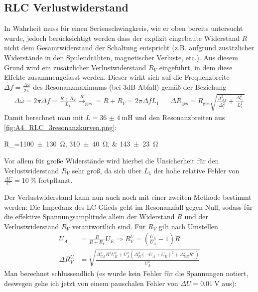 \subsection{RLC Verlustwiderstand}
\label{sec:RLC_Verlustwiderstand}
In Wahrheit muss für einen Serienschwingkreis, wie er oben bereits untersucht wurde, jedoch berücksichtigt werden dass der explizit eingebaute Widerstand \(R\) nicht dem Gesamtwiderstand der Schaltung entspricht (z.B. aufgrund zusätzlicher Widerstände in den Spulendrähten, magnetischer Verluste, etc.). Aus diesem Grund wird ein zusätzlicher Verlustwiderstand \(R_V\) eingeführt, in dem diese Effekte zusammengefasst werden. Dieser wirkt sich auf die Frequenzbreite \(\Delta f = \frac{\Delta\omega}{2\pi}\) des Resonanzmaximums (bei 3dB Abfall) gemäß der Beziehung
\begin{align}
    \Delta\omega=2\pi\Delta f=\frac{R+R_V}{L_1}\xrightarrow R_\text{ges}=R+R_V=2\pi\Delta f L_1&&\Delta R_\text{ges}=R_\text{ges}\sqrt{\frac{\Delta_{\Delta f}^{2}}{\Delta_{f}^{2}} + \frac{\Delta_{L_1}^{2}}{L_1^{2}}}
\end{align} 
Damit berechnet man mit \(L=\qty{36(4)}{\milli\henry}\) und den Resonanzbreiten aus \cref{fig:A4_RLC_3resonanzkurven.png}:
\begin{rbl}
    R_=\qtylist{1100(130);310(40);143(23)}{\ohm}
\end{rbl}
Vor allem für große Widerstände wird hierbei die Unsicherheit für den Verlustwiderstand \(R_V\) sehr groß, da sich über \(L_1\) der hohe relative Fehler von \(\frac{\Delta C}{C}=\qty{10}{\percent}\) fortpflanzt.

Der Verlustwiderstand kann nun auch noch mit einer zweiten Methode bestimmt werden: Die Impedanz des LC-Glieds geht im Resonanzfall gegen Null, sodass für die effektive Spannungsamplitude allein der Widerstand \(R\) und der Verlustwiderstand \(R_V\) verantwortlich sind. Für \(R_V\) gilt nach Umstellen 
\begin{align}
    U_A&=\frac{R}{R+R_V}U_E \Rightarrow  R_V^U=\left(\frac{U_E}{U_A}-1\right)R\\
    \Delta R_V^U&=\sqrt{\frac{\Delta_{U A}^{2} R^{2} U_{E}^{2} + U_{A}^{2} \left(\Delta_{R}^{2} \left(- U_{A} + U_{E}\right)^{2} + \Delta_{U E}^{2} R^{2}\right)}{U_{A}^{4}}}
\end{align}
Man berechnet schlussendlich (es wurde kein Fehler für die Spannungen notiert, deswegen gehe ich jetzt von einem pauschalen Fehler von \(\Delta U=\qty{0.01}{\volt}\) aus):

